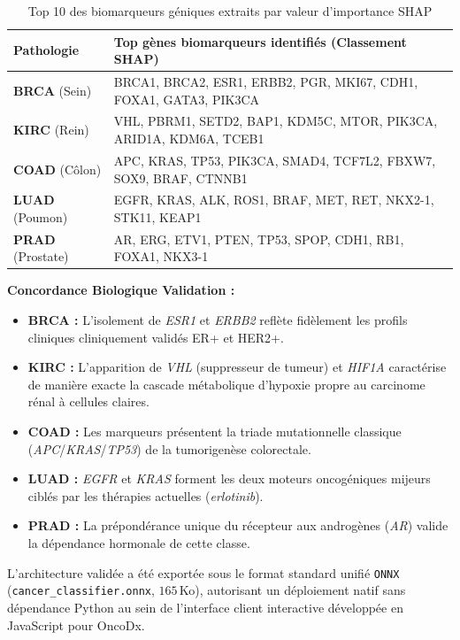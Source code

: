\documentclass[12pt,a4paper]{report}
\begin{document}
\begin{table}[H]
\centering
\small
\caption{Top 10 des biomarqueurs g\'eniques extraits par valeur d'importance SHAP}
\label{tab:biomarqueurs}
\begin{tabularx}{\textwidth}{lX}
\toprule
\textbf{Pathologie} & \textbf{Top g\`enes biomarqueurs identifi\'es (Classement SHAP)} \\
\midrule
\textbf{BRCA} (Sein) & BRCA1, BRCA2, ESR1, ERBB2, PGR, MKI67, CDH1, FOXA1, GATA3, PIK3CA \\
\textbf{KIRC} (Rein) & VHL, PBRM1, SETD2, BAP1, KDM5C, MTOR, PIK3CA, ARID1A, KDM6A, TCEB1 \\
\textbf{COAD} (C\^olon) & APC, KRAS, TP53, PIK3CA, SMAD4, TCF7L2, FBXW7, SOX9, BRAF, CTNNB1 \\
\textbf{LUAD} (Poumon) & EGFR, KRAS, ALK, ROS1, BRAF, MET, RET, NKX2-1, STK11, KEAP1 \\
\textbf{PRAD} (Prostate) & AR, ERG, ETV1, PTEN, TP53, SPOP, CDH1, RB1, FOXA1, NKX3-1 \\
\bottomrule
\end{tabularx}
\end{table}

\begin{infobox}
\textbf{Concordance Biologique Validation : }
\begin{itemize}[label=\checkmark]
    \item \textbf{BRCA :} L'isolement de \textit{ESR1} et \textit{ERBB2} refl\`ete fid\`element les profils cliniques cliniquement valid\'es ER+ et HER2+.
    \item \textbf{KIRC :} L'apparition de \textit{VHL} (suppresseur de tumeur) et \textit{HIF1A} caract\'erise de mani\`ere exacte la cascade m\'etabolique d'hypoxie propre au carcinome r\'enal \`a cellules claires.
    \item \textbf{COAD :} Les marqueurs pr\'esentent la triade mutationnelle classique (\textit{APC}/\textit{KRAS}/\textit{TP53}) de la tumorigen\`ese colorectale.
    \item \textbf{LUAD :} \textit{EGFR} et \textit{KRAS} forment les deux moteurs oncog\'eniques mijeurs cibl\'es par les th\'erapies actuelles (\textit{erlotinib}).
    \item \textbf{PRAD :} La pr\'epond\'erance unique du r\'ecepteur aux androg\`enes (\textit{AR}) valide la d\'ependance hormonale de cette classe.
\end{itemize}
\end{infobox}

\begin{successbox}
L'architecture valid\'ee a \'et\'e export\'ee sous le format standard unifi\'e \texttt{ONNX} (\texttt{cancer\_classifier.onnx}, $165$\,Ko), autorisant un d\'eploiement natif sans d\'ependance Python au sein de l'interface client interactive d\'evelopp\'ee en JavaScript pour OncoDx.
\end{successbox}
\end{document}
